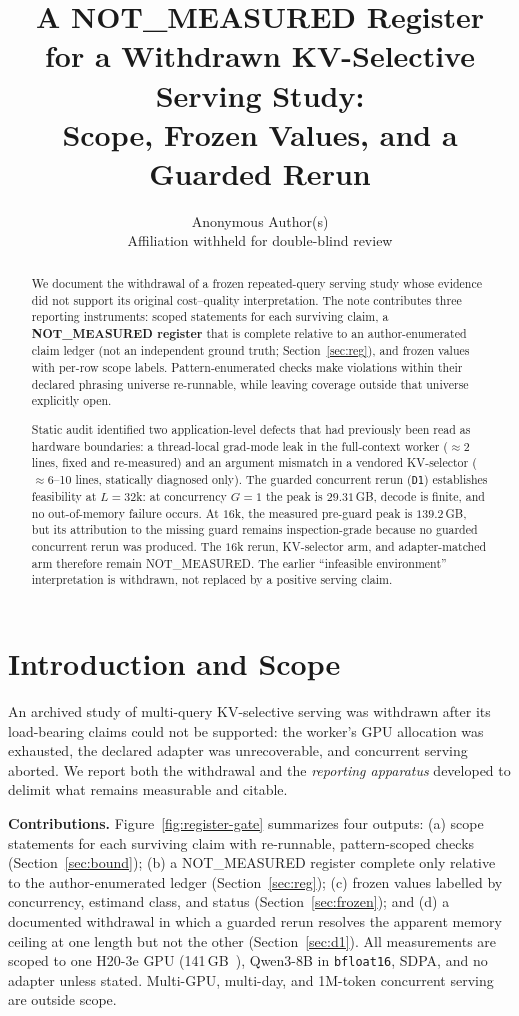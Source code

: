 \documentclass{article}
\title{A NOT\_MEASURED Register\\for a Withdrawn KV-Selective Serving Study:\\Scope, Frozen Values, and a Guarded Rerun}
\author{Anonymous Author(s)\\
Affiliation withheld for double-blind review\\
}
\date{}
\begin{document}
\raggedbottom

\maketitle

\begin{abstract}
We document the withdrawal of a frozen repeated-query serving study whose evidence did not
support its original cost--quality interpretation.  The note contributes three reporting
instruments: scoped statements for each surviving claim, a \textbf{NOT\_MEASURED register}
that is complete relative to an author-enumerated claim ledger (not an independent ground
truth; Section~\ref{sec:reg}), and frozen values with per-row scope labels.  Pattern-enumerated
checks make violations within their declared phrasing universe re-runnable, while leaving
coverage outside that universe explicitly open.

Static audit identified two application-level defects that had previously been read as
hardware boundaries: a thread-local grad-mode leak in the full-context worker
($\approx$2 lines, fixed and re-measured) and an argument mismatch in a vendored
KV-selector ($\approx$6--10 lines, statically diagnosed only).  The guarded concurrent
rerun (\texttt{D1}) establishes feasibility at $L{=}32$k: at concurrency $G{=}1$ the peak
is $29.31$\,GB, decode is finite, and no out-of-memory failure occurs.  At $16$k, the
measured pre-guard peak is $139.2$\,GB, but its attribution to the missing guard remains
inspection-grade because no guarded concurrent rerun was produced.  The $16$k rerun,
KV-selector arm, and adapter-matched arm therefore remain NOT\_MEASURED.  The earlier
``infeasible environment'' interpretation is withdrawn, not replaced by a positive serving
claim.
\end{abstract}

\section{Introduction and Scope}\label{sec:intro}

An archived study of multi-query KV-selective serving was withdrawn after its load-bearing
claims could not be supported: the worker's GPU allocation was exhausted, the declared
adapter was unrecoverable, and concurrent serving aborted.  We report both the withdrawal and
the \emph{reporting apparatus} developed to delimit what remains measurable and citable.

\textbf{Contributions.} Figure~\ref{fig:register-gate} summarizes four outputs: (a) scope
statements for each surviving claim with re-runnable, pattern-scoped checks
(Section~\ref{sec:bound}); (b) a NOT\_MEASURED register complete only relative to the
author-enumerated ledger (Section~\ref{sec:reg}); (c) frozen values labelled by concurrency,
estimand class, and status (Section~\ref{sec:frozen}); and (d) a documented withdrawal in
which a guarded rerun resolves the apparent memory ceiling at one length but not the other
(Section~\ref{sec:d1}).  All measurements are scoped to one H20-3e GPU
(141\,GB~\citep{qwen3_2025}), Qwen3-8B in \texttt{bfloat16}, SDPA, and no adapter unless
stated.  Multi-GPU, multi-day, and 1M-token concurrent serving are outside scope.
\end{document}
